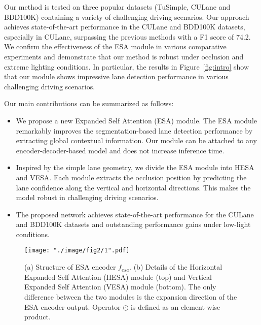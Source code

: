 \documentclass[10pt,twocolumn,letterpaper]{article}
\begin{document}
Our method is tested on three popular datasets (TuSimple, CULane and BDD100K) containing a variety of challenging driving scenarios. Our approach achieves state-of-the-art performance in the CULane and BDD100K datasets, especially in CULane, surpassing the previous methods with a F1 score of 74.2. We confirm the effectiveness of the ESA module in various comparative experiments and demonstrate that our method is robust under occlusion and extreme lighting conditions. In particular, the results in Figure~\ref{fig:intro} show that our module shows impressive lane detection performance in various challenging driving scenarios. 

Our main contributions can be summarized as follows:

\begin{itemize}
	\item We propose a new Expanded Self Attention (ESA) module. The ESA module remarkably improves the segmentation-based lane detection performance by extracting global contextual information. Our module can be attached to any encoder-decoder-based model and does not increase inference time.
	
	\item Inspired by the simple lane geometry, we divide the ESA module into HESA and VESA. Each module extracts the occlusion position by predicting the lane confidence along the vertical and horizontal directions. This makes the model robust in challenging driving scenarios.
	
	\item The proposed network achieves state-of-the-art performance for the CULane \cite{pan2017spatial} and BDD100K \cite{yu2018bdd100k} datasets and outstanding performance gains under low-light conditions.
\end{itemize}

\begin{figure*}
	\setlength{\belowcaptionskip}{-10pt}
	\begin{center}
		\texttt{[image: "./image/fig2/1".pdf]}
	\end{center}
	\vspace{-7.5mm}
	\caption{(a) Structure of ESA encoder $f_{esa}$. (b) Details of the Horizontal Expanded Self Attention (HESA) module (top) and Vertical Expanded Self Attention (VESA) module (bottom). The only difference between the two modules is the expansion direction of the ESA encoder output. Operator $\odot$ is defined as an element-wise product.}
	\label{fig:esa}
\end{figure*}
\end{document}
